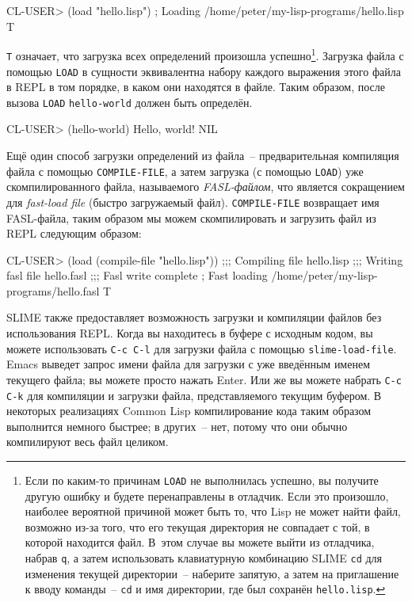 \begin{myverb}
CL-USER> (load "hello.lisp")
; Loading /home/peter/my-lisp-programs/hello.lisp
T
\end{myverb}

\lstinline{T} означает, что загрузка всех определений произошла успешно\footnote{Если по каким-то
  причинам \lstinline{LOAD} не выполнилась успешно, вы получите другую ошибку и будете перенаправлены
  в отладчик. Если это произошло, наиболее вероятной причиной может быть то, что Lisp не
  может найти файл, возможно из-за того, что его текущая директория не совпадает с той, в
  которой находится файл. В~этом случае вы можете выйти из отладчика, набрав \texttt{q}, а затем
  использовать клавиатурную комбинацию SLIME \texttt{cd} для изменения текущей директории~--
  наберите запятую, а затем на приглашение к вводу команды~-- \texttt{cd} и имя директории, где был
  сохранён \texttt{hello.lisp}.}. Загрузка файла с помощью \lstinline{LOAD} в сущности эквивалентна набору
каждого выражения этого файла в REPL в том порядке, в каком они находятся в файле. Таким
образом, после вызова \lstinline{LOAD} \lstinline{hello-world} должен быть определён.

\begin{myverb}
CL-USER> (hello-world)
Hello, world!
NIL
\end{myverb}

Ещё один способ загрузки определений из файла~-- предварительная компиляция файла с помощью
\lstinline{COMPILE-FILE}, а затем загрузка (с помощью \lstinline{LOAD}) уже скомпилированного файла, называемого
\emph{FASL-файлом}, что является сокращением для \emph{fast-load file} (быстро загружаемый
файл). \lstinline{COMPILE-FILE} возвращает имя FASL-файла, таким образом мы можем скомпилировать и
загрузить файл из REPL следующим образом:

\begin{myverb}
CL-USER> (load (compile-file "hello.lisp"))
;;; Compiling file hello.lisp
;;; Writing fasl file hello.fasl
;;; Fasl write complete
; Fast loading /home/peter/my-lisp-programs/hello.fasl
T
\end{myverb}

SLIME также предоставляет возможность загрузки и компиляции файлов без использования
REPL. Когда вы находитесь в буфере с исходным кодом, вы можете использовать \texttt{C-c C-l} для
загрузки файла с помощью \texttt{slime-load-file}. Emacs выведет запрос имени файла для загрузки с
уже введённым именем текущего файла; вы можете просто нажать Enter. Или же вы можете
набрать \texttt{C-c C-k} для компиляции и загрузки файла, представляемого текущим буфером. В
некоторых реализациях Common Lisp компилирование кода таким образом выполнится немного
быстрее; в других~-- нет, потому что они обычно компилируют весь файл целиком.

